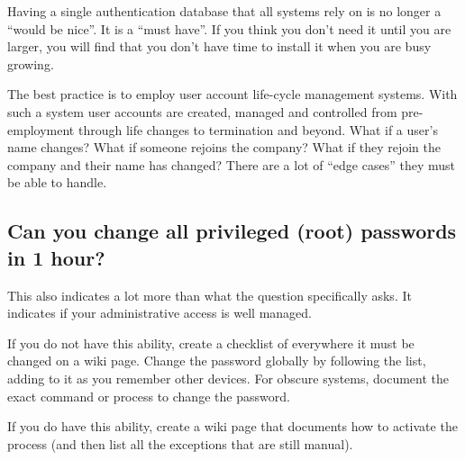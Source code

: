 \documentclass{article}
\begin{document}
Having a single authentication database that all systems rely on is no longer a ``would be nice''. It is a ``must have''. If you think you don't need it until you are larger, you will find that you don't have time to install it when you are busy growing.

The best practice is to employ user account life-cycle management systems. With such a system user accounts are created, managed and controlled from pre-employment through life changes to termination and beyond. What if a user's name changes? What if someone rejoins the company? What if they rejoin the company and their name has changed? There are a lot of ``edge cases'' they must be able to handle.

\subsection{Can you change all privileged (root) passwords in 1 hour?}
This also indicates a lot more than what the question specifically asks. It indicates if your administrative access is well managed.

If you do not have this ability, create a checklist of everywhere it must be changed on a wiki page. Change the password globally by following the list, adding to it as you remember other devices. For obscure systems, document the exact command or process to change the password.

If you do have this ability, create a wiki page that documents how to activate the process (and then list all the exceptions that are still manual).
\end{document}
